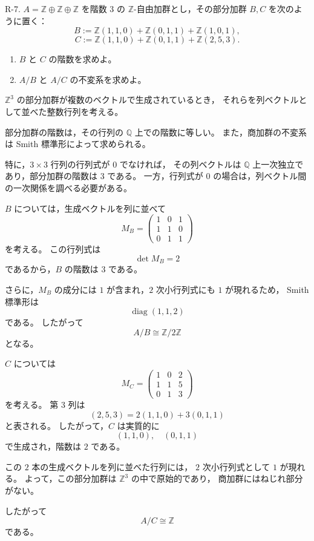 
\begin{exercise}
	R-7. $A=\mathbb{Z}\oplus\mathbb{Z}\oplus\mathbb{Z}$ を階数 $3$ の
	$\mathbb{Z}$-自由加群とし，その部分加群 $B,C$ を次のように置く：
	\[
	B:=\mathbb{Z}(1,1,0)+\mathbb{Z}(0,1,1)+\mathbb{Z}(1,0,1),
	\]
	\[
	C:=\mathbb{Z}(1,1,0)+\mathbb{Z}(0,1,1)+\mathbb{Z}(2,5,3).
	\]
	\begin{enumerate}
		\item $B$ と $C$ の階数を求めよ。
		\item $A/B$ と $A/C$ の不変系を求めよ。
	\end{enumerate}
\end{exercise}

\begin{background}
	$\mathbb{Z}^3$ の部分加群が複数のベクトルで生成されているとき，
	それらを列ベクトルとして並べた整数行列を考える。
	
	部分加群の階数は，その行列の $\mathbb{Q}$ 上での階数に等しい。
	また，商加群の不変系は Smith 標準形によって求められる。
	
	特に，$3\times 3$ 行列の行列式が $0$ でなければ，
	その列ベクトルは $\mathbb{Q}$ 上一次独立であり，部分加群の階数は $3$ である。
	一方，行列式が $0$ の場合は，列ベクトル間の一次関係を調べる必要がある。
\end{background}

\begin{strategy}
	$B$ については，生成ベクトルを列に並べて
	\[
	M_B=
	\begin{pmatrix}
		1 & 0 & 1\\
		1 & 1 & 0\\
		0 & 1 & 1
	\end{pmatrix}
	\]
	を考える。
	この行列式は
	\[
	\det M_B=2
	\]
	であるから，$B$ の階数は $3$ である。
	
	さらに，$M_B$ の成分には $1$ が含まれ，$2$ 次小行列式にも $1$ が現れるため，
	Smith 標準形は
	\[
	\operatorname{diag}(1,1,2)
	\]
	である。
	したがって
	\[
	A/B\cong \mathbb{Z}/2\mathbb{Z}
	\]
	となる。
	
	$C$ については
	\[
	M_C=
	\begin{pmatrix}
		1 & 0 & 2\\
		1 & 1 & 5\\
		0 & 1 & 3
	\end{pmatrix}
	\]
	を考える。
	第 $3$ 列は
	\[
	(2,5,3)=2(1,1,0)+3(0,1,1)
	\]
	と表される。
	したがって，$C$ は実質的に
	\[
	(1,1,0),\quad (0,1,1)
	\]
	で生成され，階数は $2$ である。
	
	この $2$ 本の生成ベクトルを列に並べた行列には，
	$2$ 次小行列式として $1$ が現れる。
	よって，この部分加群は $\mathbb{Z}^3$ の中で原始的であり，
	商加群にはねじれ部分がない。
	
	したがって
	\[
	A/C\cong \mathbb{Z}
	\]
	である。
\end{strategy}